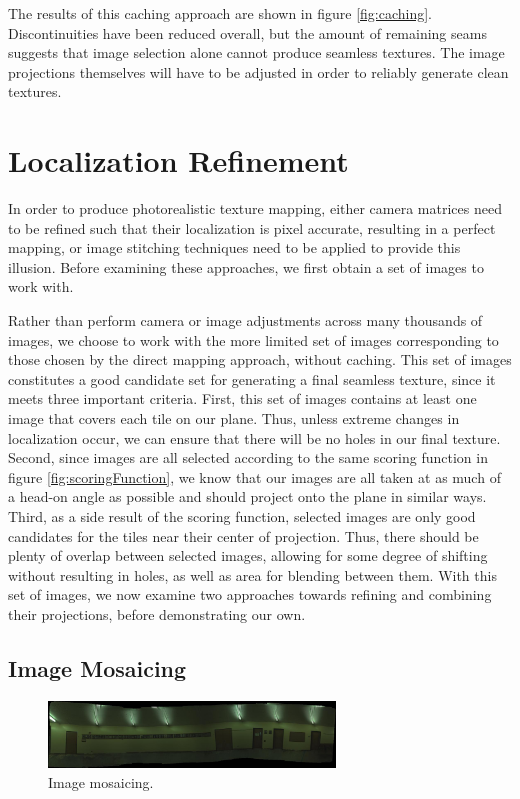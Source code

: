\documentclass[10pt,twocolumn,letterpaper]{article}
\begin{document}
The results of this caching approach are shown in figure
\ref{fig:caching}.  Discontinuities have been reduced overall, but the
amount of remaining seams suggests that image selection alone cannot
produce seamless textures. The image projections themselves will have
to be adjusted in order to reliably generate clean textures.


\section{Localization Refinement}
In order to produce photorealistic texture mapping, either camera
matrices need to be refined such that their localization is pixel
accurate, resulting in a perfect mapping, or image stitching
techniques need to be applied to provide this illusion. Before
examining these approaches, we first obtain a set of images to work
with.

Rather than perform camera or image adjustments across many thousands
of images, we choose to work with the more limited set of images
corresponding to those chosen by the direct mapping approach, without
caching. This set of images constitutes a good candidate set for
generating a final seamless texture, since it meets three important
criteria. First, this set of images contains at least one image that
covers each tile on our plane. Thus, unless extreme changes in
localization occur, we can ensure that there will be no holes in our
final texture. Second, since images are all selected according to the
same scoring function in figure \ref{fig:scoringFunction}, we know
that our images are all taken at as much of a head-on angle as
possible and should project onto the plane in similar ways. Third, as
a side result of the scoring function, selected images are only good
candidates for the tiles near their center of projection. Thus, there
should be plenty of overlap between selected images, allowing for some
degree of shifting without resulting in holes, as well as area for
blending between them. With this set of images, we now examine two
approaches towards refining and combining their projections, before
demonstrating our own.

\subsection{Image Mosaicing}

\begin{figure}
  \centering
  \includegraphics[width=3in]{panoMy.jpg}
  \caption{Image mosaicing. }
  \label{fig:mosaic}
\end{figure}
\end{document}
